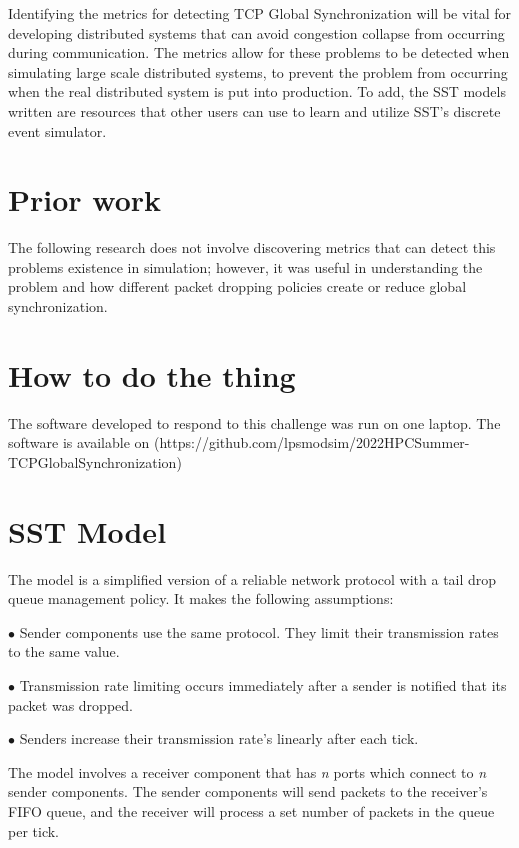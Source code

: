 \documentclass{article}
\begin{document}
Identifying the metrics for detecting TCP Global Synchronization will be vital for developing distributed systems that can avoid congestion collapse from occurring during communication. The metrics allow for these problems to be detected when simulating large scale distributed systems, to prevent the problem from occurring when the real distributed system is put into production. To add, the SST models written are resources that other users can use to learn and utilize SST's discrete event simulator.

\section{Prior work} %
The following research does not involve discovering metrics that can detect this problems existence in simulation; however, it was useful in understanding the problem and how different packet dropping policies create or reduce global synchronization. \cite{Bashi2017}

\section{How to do the thing}

The software developed to respond to this challenge was run on one laptop.
The software is available on (https://github.com/lpsmodsim/2022HPCSummer-TCPGlobalSynchronization)

\section{SST Model}

The model is a simplified version of a reliable network protocol with a tail drop queue management policy. It makes the following assumptions:\newline

$\bullet$ Sender components use the same protocol. They limit their transmission rates to the same value.

$\bullet$ Transmission rate limiting occurs immediately after a sender is notified that its packet was dropped.

$\bullet$ Senders increase their transmission rate's linearly after each tick.\newline

The model involves a receiver component that has \textit{n} ports which connect to \textit{n} sender components. The sender components will send packets to the receiver's FIFO queue, and the receiver will process a set number of packets in the queue per tick. 
\end{document}
